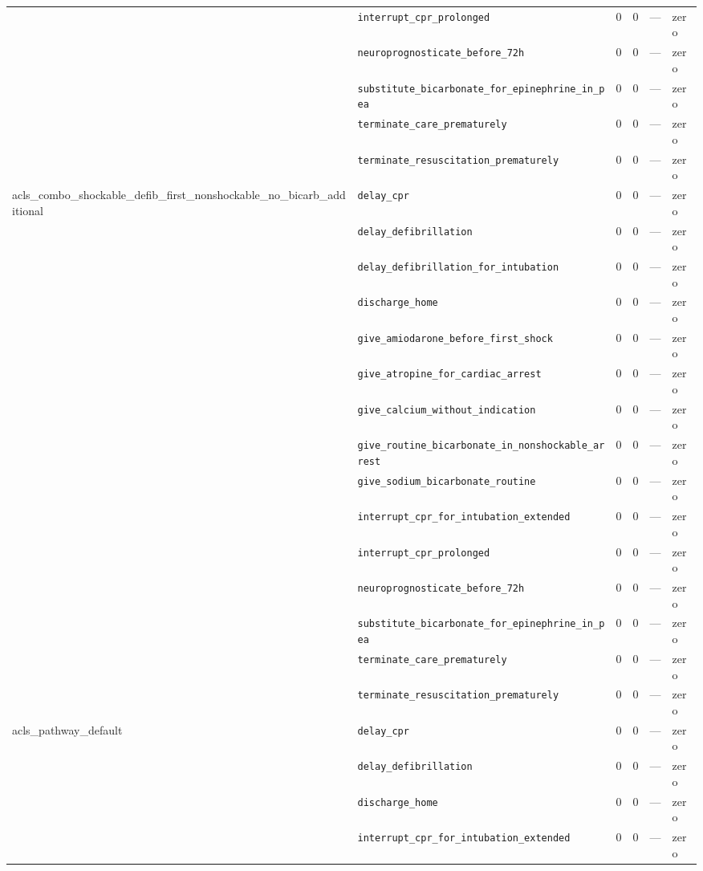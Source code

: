 \begin{table}[ht]
\begin{tabular}{llrrrl}
 & \texttt{interrupt\_cpr\_prolonged} & 0 & 0 & — & zero \\
 & \texttt{neuroprognosticate\_before\_72h} & 0 & 0 & — & zero \\
 & \texttt{substitute\_bicarbonate\_for\_epinephrine\_in\_pea} & 0 & 0 & — & zero \\
 & \texttt{terminate\_care\_prematurely} & 0 & 0 & — & zero \\
 & \texttt{terminate\_resuscitation\_prematurely} & 0 & 0 & — & zero \\
\midrule
acls\_combo\_shockable\_defib\_first\_nonshockable\_no\_bicarb\_additional & \texttt{delay\_cpr} & 0 & 0 & — & zero \\
 & \texttt{delay\_defibrillation} & 0 & 0 & — & zero \\
 & \texttt{delay\_defibrillation\_for\_intubation} & 0 & 0 & — & zero \\
 & \texttt{discharge\_home} & 0 & 0 & — & zero \\
 & \texttt{give\_amiodarone\_before\_first\_shock} & 0 & 0 & — & zero \\
 & \texttt{give\_atropine\_for\_cardiac\_arrest} & 0 & 0 & — & zero \\
 & \texttt{give\_calcium\_without\_indication} & 0 & 0 & — & zero \\
 & \texttt{give\_routine\_bicarbonate\_in\_nonshockable\_arrest} & 0 & 0 & — & zero \\
 & \texttt{give\_sodium\_bicarbonate\_routine} & 0 & 0 & — & zero \\
 & \texttt{interrupt\_cpr\_for\_intubation\_extended} & 0 & 0 & — & zero \\
 & \texttt{interrupt\_cpr\_prolonged} & 0 & 0 & — & zero \\
 & \texttt{neuroprognosticate\_before\_72h} & 0 & 0 & — & zero \\
 & \texttt{substitute\_bicarbonate\_for\_epinephrine\_in\_pea} & 0 & 0 & — & zero \\
 & \texttt{terminate\_care\_prematurely} & 0 & 0 & — & zero \\
 & \texttt{terminate\_resuscitation\_prematurely} & 0 & 0 & — & zero \\
\midrule
acls\_pathway\_default & \texttt{delay\_cpr} & 0 & 0 & — & zero \\
 & \texttt{delay\_defibrillation} & 0 & 0 & — & zero \\
 & \texttt{discharge\_home} & 0 & 0 & — & zero \\
 & \texttt{interrupt\_cpr\_for\_intubation\_extended} & 0 & 0 & — & zero \\

\end{tabular}
\end{table}
